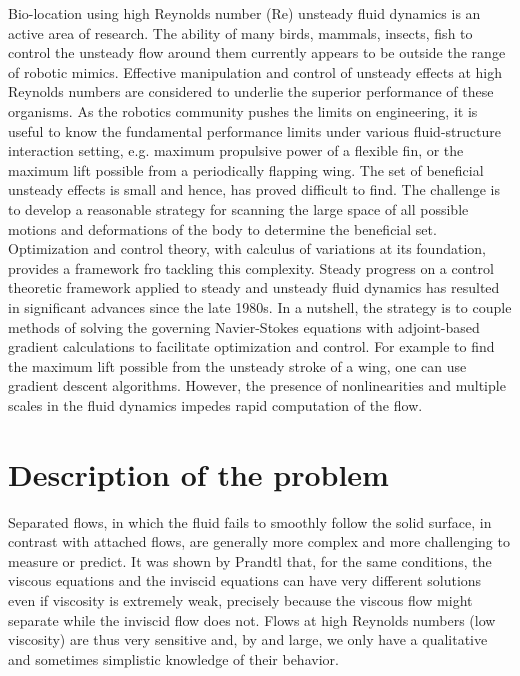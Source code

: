 




Bio-location using high Reynolds number (Re) unsteady fluid dynamics is an active area of research.
The ability of many birds, mammals, insects, fish to control the unsteady flow around them currently appears to be outside the range of robotic mimics.
Effective manipulation and control of unsteady effects at high Reynolds numbers are considered to underlie the superior performance of these organisms.
As the robotics community pushes the limits on engineering, it is useful to know the fundamental performance limits under various fluid-structure interaction setting, e.g. maximum propulsive power of a flexible fin, or the maximum lift possible from a periodically flapping wing.
The set of beneficial unsteady effects is small and hence, has proved difficult to find.
The challenge is to develop a reasonable strategy for scanning the large space of all possible motions and deformations of the body to determine the beneficial set.
Optimization and control theory, with calculus of variations at its foundation, provides a framework fro tackling this complexity.
Steady progress on a control theoretic framework applied to steady and unsteady fluid dynamics has resulted in significant advances since the late 1980s.
In a nutshell, the strategy is to couple methods of solving the governing Navier-Stokes equations with adjoint-based gradient calculations to facilitate optimization and control.
For example to find the maximum lift possible from the unsteady stroke of a wing, one can use gradient descent algorithms.
However, the presence of nonlinearities and multiple scales in the fluid dynamics impedes rapid computation of the flow.

\section{Description of the problem}

Separated flows, in which the fluid fails to smoothly follow the solid surface, in contrast with attached flows, are generally more complex and more challenging to measure or predict.
It was shown by Prandtl that, for the same conditions, the viscous equations and the inviscid equations can have very different solutions even if viscosity is extremely weak, precisely because the viscous flow might separate while the inviscid flow does not.
Flows at high Reynolds numbers (low viscosity) are thus very sensitive and, by and large, we only have a qualitative and sometimes simplistic knowledge of their behavior.

